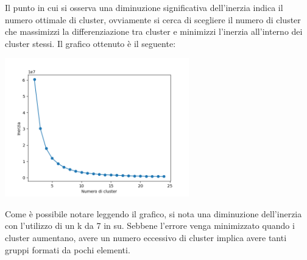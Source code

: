 \documentclass[a4paper, 10pt]{report}
\begin{document}
                Il punto in cui si osserva una diminuzione significativa dell'inerzia indica il numero ottimale di cluster, ovviamente
                si cerca di scegliere il numero di cluster che massimizzi la differenziazione tra cluster e
                minimizzi l'inerzia all'interno dei cluster stessi. Il grafico ottenuto è il seguente:

                \begin{center}
                    \includegraphics[width=8cm]{evaluation/elbowPoint}\\
                \end{center}

                Come è possibile notare leggendo il grafico, si nota una diminuzione dell'inerzia con l'utilizzo di un k da 7 in su.
                Sebbene l’errore venga minimizzato quando i cluster aumentano, avere un numero eccessivo di cluster implica avere tanti gruppi
                formati da pochi elementi.
\end{document}
